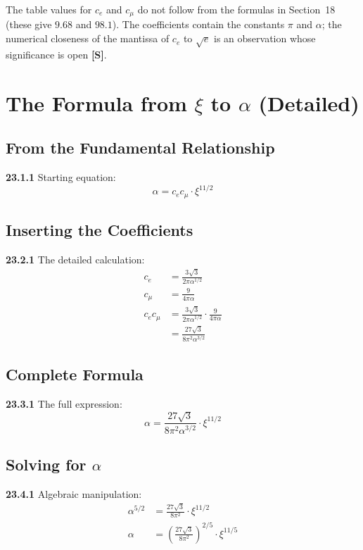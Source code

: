 The table values for $c_e$ and $c_\mu$ do not follow from the formulas in Section~18 (these give $9.68$ and $98.1$). The coefficients contain the constants $\pi$ and $\alpha$; the numerical closeness of the mantissa of $c_e$ to $\sqrt{e}$ is an observation whose significance is open \textbf{[S]}.
\section{The Formula from $\xi$ to $\alpha$ (Detailed)}

\subsection{From the Fundamental Relationship}
\noindent \textbf{23.1.1} Starting equation:
\begin{equation}
	\alpha = c_e c_\mu \cdot \xi^{11/2}
\end{equation}

\subsection{Inserting the Coefficients}
\noindent \textbf{23.2.1} The detailed calculation:
\begin{align}
	c_e &= \frac{3\sqrt{3}}{2\pi\alpha^{1/2}} \\
	c_\mu &= \frac{9}{4\pi\alpha} \\
	c_e c_\mu &= \frac{3\sqrt{3}}{2\pi\alpha^{1/2}} \cdot \frac{9}{4\pi\alpha} \\
	&= \frac{27\sqrt{3}}{8\pi^2\alpha^{3/2}}
\end{align}

\subsection{Complete Formula}
\noindent \textbf{23.3.1} The full expression:
\begin{equation}
	\alpha = \frac{27\sqrt{3}}{8\pi^2\alpha^{3/2}} \cdot \xi^{11/2}
\end{equation}

\subsection{Solving for $\alpha$}
\noindent \textbf{23.4.1} Algebraic manipulation:
\begin{align}
	\alpha^{5/2} &= \frac{27\sqrt{3}}{8\pi^2} \cdot \xi^{11/2} \\
	\alpha &= \left(\frac{27\sqrt{3}}{8\pi^2}\right)^{2/5} \cdot \xi^{11/5}
\end{align}

